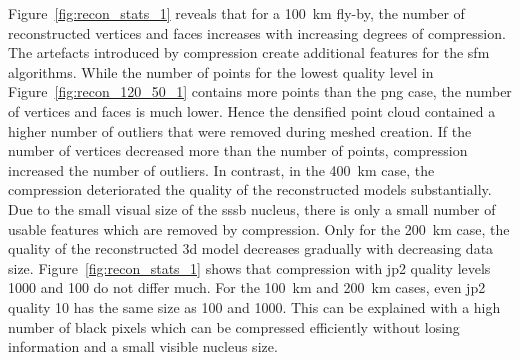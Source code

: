 Figure~\ref{fig:recon_stats_1} reveals that for a \SI{100}{\kilo\meter} fly-by, the number of reconstructed vertices and faces increases with increasing degrees of compression. The artefacts introduced by compression create additional features for the \gls{sfm} algorithms. While the number of points for the lowest quality level in Figure~\ref{fig:recon_120_50_1} contains more points than the \gls{png} case, the number of vertices and faces is much lower. Hence the densified point cloud contained a higher number of outliers that were removed during meshed creation. If the number of vertices decreased more than the number of points, compression increased the number of outliers. In contrast, in the \SI{400}{\kilo\meter} case, the compression deteriorated the quality of the reconstructed models substantially. Due to the small visual size of the \gls{sssb} nucleus, there is only a small number of usable features which are removed by compression. Only for the \SI{200}{\kilo\meter} case, the quality of the reconstructed \gls{3d} model decreases gradually with decreasing data size.
Figure~\ref{fig:recon_stats_1} shows that compression with \gls{jp2} quality levels 1000 and 100 do not differ much. For the \SI{100}{\kilo\meter} and \SI{200}{\kilo\meter} cases, even \gls{jp2} quality 10 has the same size as 100 and 1000. This can be explained with a high number of black pixels which can be compressed efficiently without losing information and a small visible nucleus size.

